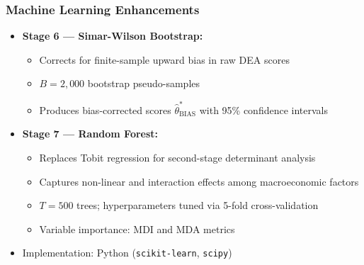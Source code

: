 \documentclass{beamer}
\begin{document}
\begin{frame}
    \frametitle{Machine Learning Enhancements}
    \begin{itemize}
        \item \textbf{Stage 6 --- Simar-Wilson Bootstrap:}
        \begin{itemize}
            \item Corrects for finite-sample upward bias in raw DEA scores
            \item $B = 2{,}000$ bootstrap pseudo-samples
            \item Produces bias-corrected scores $\hat{\theta}^*_{\text{BIAS}}$ with 95\% confidence intervals
        \end{itemize}
        \item \textbf{Stage 7 --- Random Forest:}
        \begin{itemize}
            \item Replaces Tobit regression for second-stage determinant analysis
            \item Captures non-linear and interaction effects among macroeconomic factors
            \item $T = 500$ trees; hyperparameters tuned via 5-fold cross-validation
            \item Variable importance: MDI and MDA metrics
        \end{itemize}
        \item Implementation: Python (\texttt{scikit-learn}, \texttt{scipy})
    \end{itemize}
\end{frame}

\end{document}
